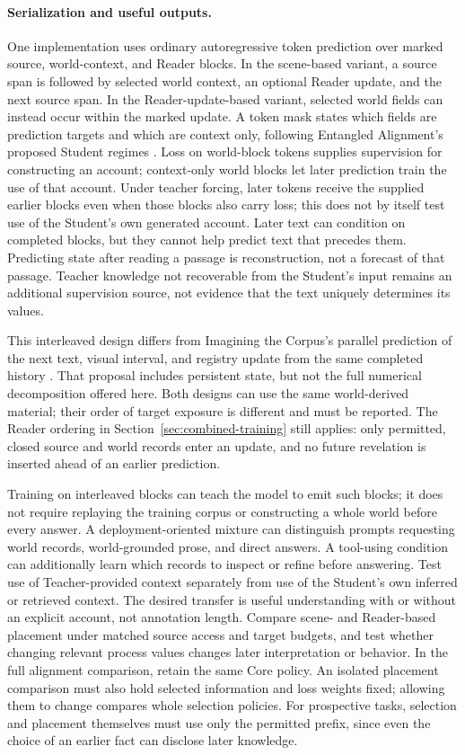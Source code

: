 \documentclass[10pt]{article}
\begin{document}
\paragraph{Serialization and useful outputs.}
One implementation uses ordinary autoregressive token prediction over marked
source, world-context, and Reader blocks. In the scene-based variant, a source
span is followed by selected world context, an optional Reader update, and
the next source span. In the Reader-update-based variant, selected world
fields can instead occur within the marked update. A token mask states which
fields are prediction targets and which are context only, following Entangled
Alignment's proposed Student regimes \cite{westerbergEntangled2026}. Loss on
world-block tokens supplies supervision for constructing an account;
context-only world blocks let later prediction train the use of that account.
Under teacher forcing, later tokens receive the supplied earlier blocks even
when those blocks also carry loss; this does not by itself test use of the
Student's own generated account.
Later text can condition on completed blocks,
but they cannot help predict text that precedes them. Predicting state after
reading a passage is reconstruction, not a forecast of that passage. Teacher
knowledge not recoverable from the Student's input remains an additional
supervision source, not evidence that the text uniquely determines its values.

This interleaved design differs from Imagining the Corpus's parallel prediction
of the next text, visual interval, and registry update from the same completed
history \cite{westerbergImagining2026}. That proposal includes persistent state,
but not the full numerical decomposition offered here. Both designs can use
the same world-derived material; their order of target exposure is different
and must be reported. The Reader ordering in
Section~\ref{sec:combined-training} still applies: only permitted, closed
source and world records enter an update, and no future revelation is inserted
ahead of an earlier prediction.

Training on interleaved blocks can teach the model to emit such blocks; it does
not require replaying the training corpus or constructing a whole world before
every answer. A deployment-oriented mixture can distinguish prompts requesting
world records, world-grounded prose, and direct answers. A tool-using condition
can additionally learn which records to inspect or refine before answering.
Test use of Teacher-provided context separately from use of the Student's own
inferred or retrieved context. The desired transfer is useful understanding
with or without an explicit account, not annotation length. Compare scene- and
Reader-based placement under matched source access and target budgets, and
test whether changing relevant process values changes later interpretation or
behavior. In the full alignment comparison, retain the same Core policy.
An isolated placement comparison must also hold selected information and loss
weights fixed; allowing them to change compares whole selection policies.
For prospective tasks, selection and placement themselves must use only the
permitted prefix, since even the choice of an earlier fact can disclose later
knowledge.
\end{document}
